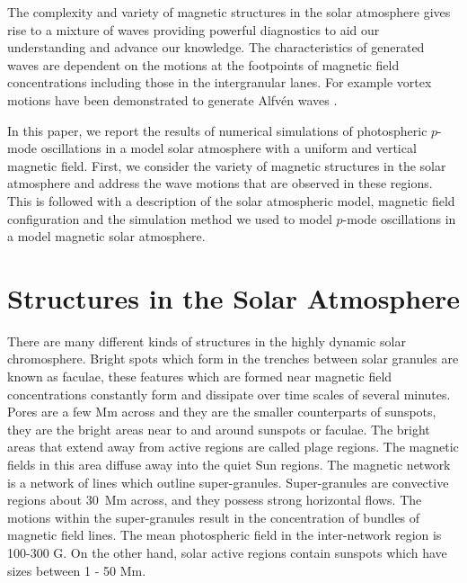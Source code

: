 \documentclass[linenumbers]{aastex63}
\begin{document}





The complexity and variety of magnetic structures in the solar atmosphere gives rise to a mixture of waves providing powerful diagnostics to aid our understanding and advance our knowledge. The characteristics of generated waves are dependent on the motions at the footpoints of magnetic field concentrations including those in the intergranular lanes. For example vortex motions have been demonstrated to generate Alfv\'en waves \citet{Fedun2009b}. 

In this paper, we report the results of numerical simulations of photospheric $p$-mode oscillations in a model solar atmosphere with a uniform and vertical magnetic field. First, we consider the variety of magnetic structures in the solar atmosphere and address the wave motions that are observed in these regions. This is followed with a description of the solar atmospheric model, magnetic field configuration and the simulation method we used to model $p$-mode oscillations in a model magnetic solar atmosphere.

\section{Structures in the Solar Atmosphere} 
\label{sec:structures}


 


There are many different kinds of structures in the highly dynamic solar chromosphere. Bright spots which form in the trenches between solar granules are known as faculae, these features which are formed near magnetic field concentrations constantly form and dissipate over time scales of several minutes. Pores are a few Mm across and they are the smaller counterparts of sunspots, they are the bright areas near to and around sunspots or faculae. The bright areas that extend away from active regions are called plage regions.  The magnetic fields in this area diffuse away into the quiet Sun regions. The magnetic network is a network of lines which outline super-granules. Super-granules are convective regions about 30~Mm across, and they possess strong horizontal flows. The motions within the super-granules result in the concentration of bundles of magnetic field lines.  The mean photospheric field in the inter-network region is 100-300 G. On the other hand, solar active regions contain sunspots which have sizes between  1 - 50 Mm. 
\end{document}
